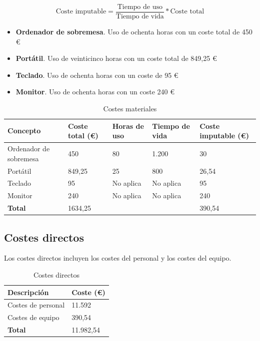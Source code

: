 \documentclass[12pt]{report} %
\begin{document}
	\begin{equation}
		\text{Coste imputable} = \frac{\text{Tiempo de uso}}{\text{Tiempo de vida}} * \text{Coste total}
	\end{equation}

	\begin{itemize}
		\item \textbf{Ordenador de sobremesa}. Uso de ochenta horas con un coste total de 450 €
		\item \textbf{Portátil}. Uso de veinticinco horas con un coste total de 849,25 €
		\item \textbf{Teclado}. Uso de ochenta horas con un coste de 95 €
		\item \textbf{Monitor}. Uso de ochenta horas con un coste 240 €
	\end{itemize}

	\begin{table}[H]
		\centering
		\caption{Costes materiales}
		\begin{tabular}{lllll}
				\toprule
				\textbf{Concepto} & \textbf{Coste total (€)} & \textbf{Horas de uso} & \textbf{Tiempo de vida} & \textbf{Coste imputable (€)}\\
				\midrule
				Ordenador de sobremesa & 450 & 80 & 1.200  & 30 \\
				Portátil & 849,25 & 25 & 800  & 26,54 \\
				Teclado & 95 & No aplica & No aplica  & 95 \\
				Monitor & 240 & No aplica & No aplica  & 240 \\
				\bottomrule
				\textbf{Total} & 1634,25 & & & 390,54
		\end{tabular}
	\end{table}

	\subsection{Costes directos}
	Los costes directos incluyen los costes del personal y los costes del equipo.
	\begin{table}[H]
		\centering
		\caption{Costes directos}
		\begin{tabular}{ll}
				\toprule
				\textbf{Descripción} & \textbf{Coste (€)}\\
				\midrule
				Costes de personal & 11.592  \\
				Costes de equipo & 390,54  \\
				\bottomrule
				\textbf{Total} & 11.982,54
		\end{tabular}
	\end{table}
\end{document}
